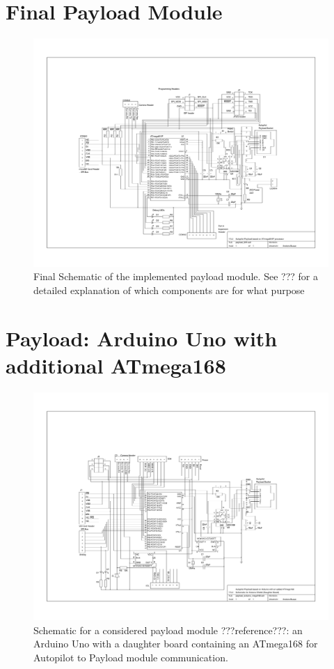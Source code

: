 \section{Final Payload Module}
\label{Payload_Schematic}
\begin{figure}[H]
\includegraphics[width=1.4\textwidth, angle=90]{schematics/payload_644.pdf}
\caption{Final Schematic of the implemented payload module. See ??? for a 
detailed explanation of which components are for what purpose}
\end{figure}

\section{Payload: Arduino Uno with additional ATmega168}
\label{Payload_Schematic}
\begin{figure}[H]
\includegraphics[width=1.4\textwidth, angle=90]{schematics/payload_arduino_mega168.pdf}
\caption{Schematic for a considered payload module ???reference???: an 
Arduino Uno with a daughter board containing an ATmega168 for Autopilot to 
Payload module communication.}
\end{figure}

